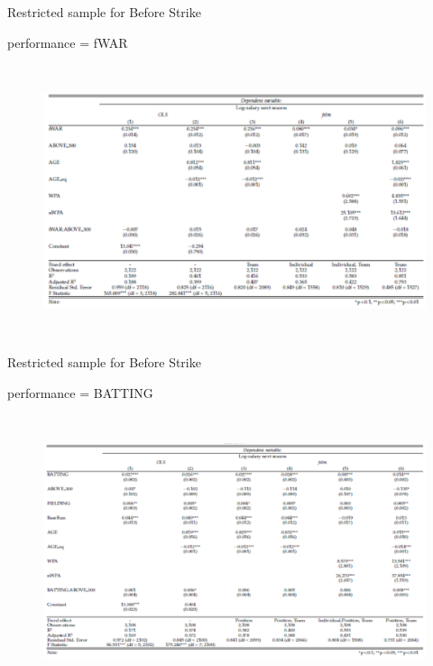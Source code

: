 \documentclass[dvipdfmx,12pt]{beamer}
\begin{document}
\begin{frame}
  \scriptsize
  Restricted sample for Before Strike

  performance = fWAR

  \begin{figure}
    \includegraphics[width = 12cm, height = 8cm]{fig_tab/mt_tab3_0.pdf}
\label{}
  \end{figure}
\end{frame}

\begin{frame}
  \scriptsize
  Restricted sample for Before Strike

  performance = BATTING

  \begin{figure}
    \includegraphics[width = 12cm, height = 8cm]{fig_tab/mt_tab3.pdf}
\label{}
  \end{figure}
\end{frame}
\end{document}
